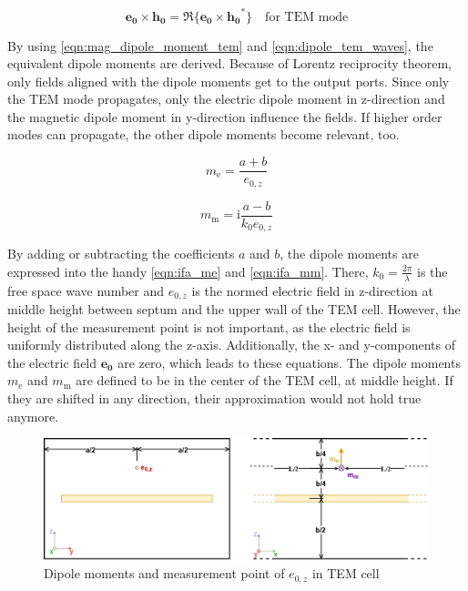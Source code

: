 \begin{equation}
    \mathbf{e_0}\times\mathbf{h_0}=\Re\{\mathbf{e_0}\times\mathbf{h_0}^*\} \quad\text{for TEM mode}
    \label{eqn:equivalent_tem}
\end{equation}


By using \autoref{eqn:mag_dipole_moment_tem} and \autoref{eqn:dipole_tem_waves}, the equivalent dipole moments are derived. Because of Lorentz reciprocity theorem, only fields aligned with the dipole moments get to the output ports. Since only the TEM mode propagates, only the electric dipole moment in z-direction and the magnetic dipole moment in y-direction influence the fields. If higher order modes can propagate, the other dipole moments become relevant, too.



\begin{equation}
    m_{\mathrm{e}}=\frac{a+b}{e_{0,z}}
    \label{eqn:ifa_me}
\end{equation}

\begin{equation}
    m_{\mathrm{m}}=\mathrm{i}\frac{a-b}{k_0  e_{0,z}}
    \label{eqn:ifa_mm}
\end{equation}

By adding or subtracting the coefficients $a$ and $b$, the dipole moments are expressed into the handy \autoref{eqn:ifa_me} and \autoref{eqn:ifa_mm}. There, $k_0=\frac{2\pi}{\lambda}$ is the free space wave number and $e_{0,z}$ is the normed electric field in z-direction at middle height between septum and the upper wall of the TEM cell. However, the height of the measurement point is not important, as the electric field is uniformly distributed along the z-axis. Additionally, the x- and y-components of the electric field $\mathbf{e_{0}}$ are zero, which leads to these equations. The dipole moments $m_{\mathrm{e}}$ and $m_{\mathrm{m}}$ are defined to be in the center of the TEM cell, at middle height. If they are shifted in any direction, their approximation would not hold true anymore.

\begin{figure}[h]
    \centering
    \includegraphics[width=1\linewidth]{Documentation//content//30_simulations//img/sketch_dipoles_tem_cell.png}
    \caption{Dipole moments and measurement point of $e_{0,z}$ in TEM cell}
    \label{fig:sketch_dipoles_tem_cell}
\end{figure}

